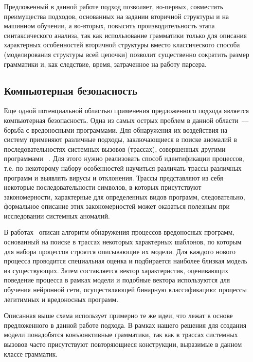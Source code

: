 Предложенный в данной работе подход позволяет, во-первых, совместить преимущества подходов, основанных на задании вторичной структуры и на машинном обучении, а во-вторых, повысить производительность этапа синтаксического анализа, так как использование грамматики только для описания характерных особенностей вторичной структуры вместо классического способа (моделирования структуры всей цепочки) позволит существенно сократить размер грамматики и, как следствие, время, затраченное на работу парсера.

\subsection{Компьютерная безопасность}
Еще одной потенциальной областью применения предложенного подхода является компьютерная безопасность. Одна из самых острых проблем в данной области~--- борьба с вредоносными программами. Для обнаружения их воздействия на систему применяют различные подходы, заключающиеся в поиске аномалий в последовательностях системных вызовов (трассах), совершенных другими программами ~\cite{ghosh1999study,hofmeyr1998intrusion,wespi2000intrusion}. Для этого нужно реализовать способ идентификации процессов, т.е. по некоторому набору особенностей научиться различать трассы различных программ и выявлять вирусы и отклонения. Трассы представляют из себя некоторые последовательности символов, в которых присутствуют закономерности, характерные для определенных видов программ, следовательно, формальное описание этих закономерностей может оказаться полезным при исследовании системных аномалий.

В работах~\cite{baklanovsk2015,baklanovsk2016} описан алгоритм обнаружения процессов вредоносных программ, основанный на поиске в трассах некоторых характерных шаблонов, по которым для набора процессов строятся описывающие их модели. Для каждого нового процесса проводится специальная оценка и подбирается наиболее близкая модель из существующих. Затем составляется вектор характеристик, оценивающих поведение процесса в рамках модели и подобные вектора используются для обучения нейронной сети, осуществляющей бинарную классификацию: процессы легитимных и вредоносных программ.

Описанная выше схема использует примерно те же идеи, что лежат в основе предложенного в данной работе подхода. В рамках нашего решения для создания модели понадобятся конъюнктивные грамматики, так как в трассах системных вызовов часто присутствуют повторяющиеся конструкции, выразимые в данном классе грамматик.

